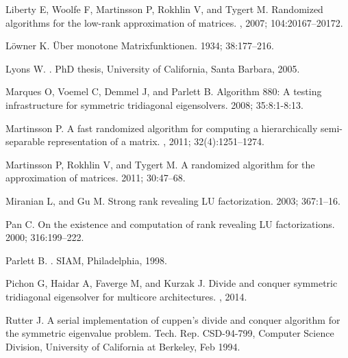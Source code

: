 \documentclass[times]{nlaauth}
\newcounter{algorithm}
\begin{document}
\begin{thebibliography}{99}
{  Liberty E, Woolfe F, Martinsson P, Rokhlin V, and Tygert M.}
\newblock Randomized algorithms for the low-rank approximation of matrices.
, 2007;  104:20167--20172.

{  L\"{o}wner K.}
\newblock \"{U}ber monotone {Matrixfunktionen}.
 1934; 38:177--216.

{  Lyons W.}
.
\newblock PhD thesis, University of California, Santa Barbara, 2005.

{  Marques O, Voemel C, Demmel J, and Parlett B.}
\newblock Algorithm 880: A testing infrastructure for symmetric tridiagonal
  eigensolvers.
 2008; 35:8:1-8:13.

{  Martinsson P.}
\newblock A fast randomized algorithm for computing a hierarchically
  semi-separable representation of a matrix.
, 2011; 32(4):1251--1274.

{  Martinsson P, Rokhlin V, and Tygert M.}
\newblock A randomized algorithm for the approximation of matrices.
 2011;  30:47--68.

{  Miranian L, and Gu M.}
\newblock Strong rank revealing {LU} factorization.
 2003; 367:1--16.

{  Pan C.}
\newblock On the existence and computation of rank revealing {LU}
  factorizations.
 2000;  316:199--222.

{  Parlett B.}
.
\newblock SIAM, Philadelphia, 1998.



{  Pichon G, Haidar A, Faverge M, and Kurzak J.}
\newblock Divide and conquer symmetric tridiagonal eigensolver for multicore architectures.
, 2014.

{  Rutter J.}
\newblock A serial implementation of cuppen's divide and conquer algorithm for
  the symmetric eigenvalue problem.
\newblock Tech. Rep. CSD-94-799, Computer Science Division, University of
  California at Berkeley, Feb 1994.


\end{thebibliography}
\end{document}
